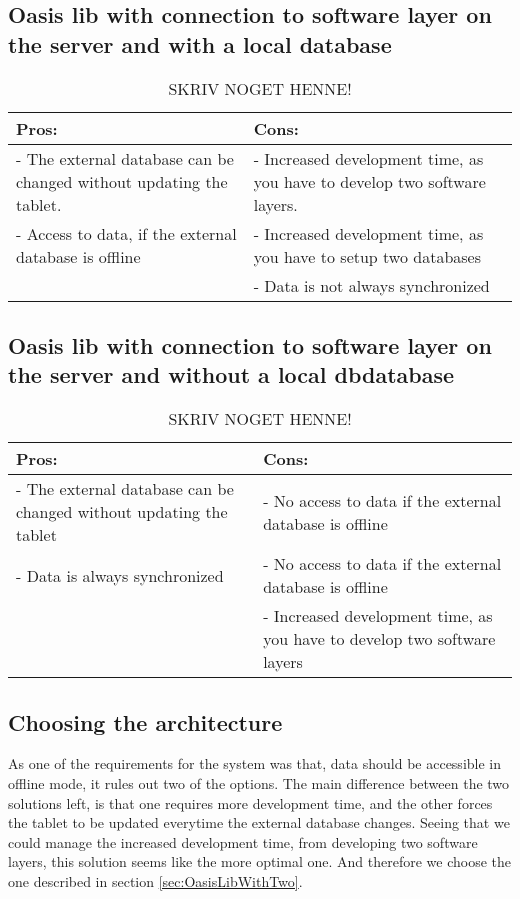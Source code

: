 \subsection{Oasis lib with connection to software layer on the server and with a local database}
\begin{table}[htbp]
	\centering
		\begin{tabular}{| p{9cm} | m{9cm} |}
			\hline
			Pros: & Cons: \\ \hline
			- The external database can be changed without updating the tablet. & - Increased development time, as you have to develop two software layers. \\ \hline
			- Access to data, if the external database is offline & - Increased development time, as you have to setup two databases \\ \hline
			& - Data is not always synchronized \\ \hline
		\end{tabular}
	\caption{SKRIV NOGET HENNE!}
	\label{tab:procon3}
\end{table}

\subsection{Oasis lib with connection to software layer on the server and without a local dbdatabase}
\begin{table}[htbp]
	\centering
		\begin{tabular}{| p{9cm} | m{9cm} |}
			\hline
			Pros: & Cons: \\ \hline
			- The external database can be changed without updating the tablet & - No access to data if the external database is offline \\ \hline
			- Data is always synchronized & - No access to data if the external database is offline \\ \hline
			& - Increased development time, as you have to develop two software layers \\ \hline
		\end{tabular}
	\caption{SKRIV NOGET HENNE!}
	\label{tab:procon4}
\end{table}

\subsection{Choosing the architecture}
As one of the requirements for the system was that, data should be accessible in offline mode, it rules out two of the options.
The main difference between the two solutions left, is that one requires more development time, and the other forces the tablet to be updated everytime the external database changes.
Seeing that we could manage the increased development time, from developing two software layers, this solution seems like the more optimal one. And therefore we choose the one described in section \vref{sec:OasisLibWithTwo}.